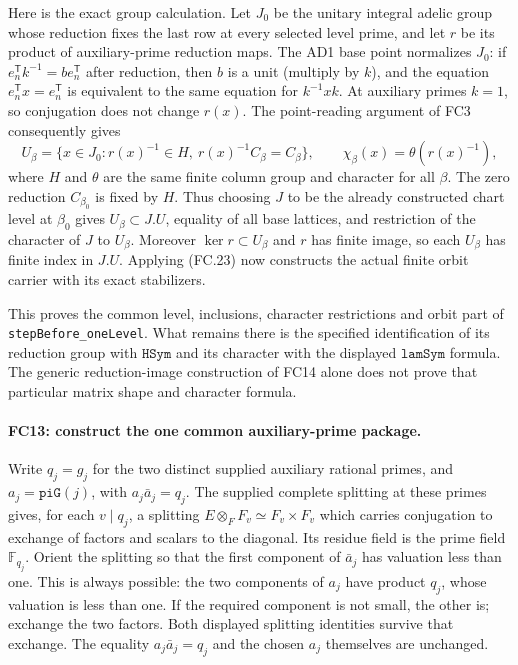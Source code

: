 Here is the exact group calculation. Let $J_0$ be the unitary integral
adelic group whose reduction fixes the last row at every selected level
prime, and let $r$ be its product of auxiliary-prime reduction maps.
The AD1 base point normalizes $J_0$: if
$e_n^{\mathsf T}k^{-1}=b e_n^{\mathsf T}$ after reduction, then
$b$ is a unit (multiply by $k$), and the equation
$e_n^{\mathsf T}x=e_n^{\mathsf T}$ is equivalent to the same
equation for $k^{-1}xk$. At auxiliary primes $k=1$, so conjugation
does not change $r(x)$. The point-reading argument of FC3 consequently
gives
\[
 U_\beta=\{x\in J_0:r(x)^{-1}\in H,
                   \ r(x)^{-1}C_\beta=C_\beta\},
 \qquad \chi_\beta(x)=\theta(r(x)^{-1}),             \tag{FC.23a}
\]
where $H$ and $\theta$ are the same finite column group and character
for all $\beta$. The zero reduction $C_{\beta_0}$ is fixed by $H$.
Thus choosing $J$ to be the already constructed chart level at
$\beta_0$ gives $U_\beta\subset J.U$, equality of all base
lattices, and restriction of the character of $J$ to $U_\beta$.
Moreover $\ker r\subset U_\beta$ and $r$ has finite image, so
each $U_\beta$ has finite index in $J.U$. Applying (FC.23) now
constructs the actual finite orbit carrier with its exact stabilizers.

This proves the common level, inclusions, character restrictions and
orbit part of \texttt{stepBefore\_oneLevel}. What remains there is
the specified identification of its reduction group with
$\texttt{HSym}$ and its character with the displayed
$\texttt{lamSym}$ formula. The generic reduction-image construction
of FC14 alone does not prove that particular matrix shape and character
formula.

\paragraph{FC13: construct the one common auxiliary-prime package.}
Write $q_j=g_j$ for the two distinct supplied auxiliary rational primes,
and $a_j=\texttt{piG}(j)$, with $a_j\bar a_j=q_j$.
The supplied complete splitting at these primes gives, for each
$v\mid q_j$, a splitting
$E\otimes_FF_v\simeq F_v\times F_v$ which carries conjugation
to exchange of factors and scalars to the diagonal. Its residue field
is the prime field $\mathbb F_{q_j}$. Orient the splitting so that the
first component of $\bar a_j$ has valuation less than one.
This is always possible: the two components of $a_j$ have product
$q_j$, whose valuation is less than one. If the required component is
not small, the other is; exchange the two factors. Both displayed
splitting identities survive that exchange. The equality
$a_j\bar a_j=q_j$ and the chosen $a_j$ themselves are unchanged.

